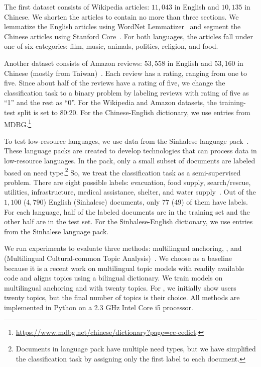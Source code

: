 The first dataset consists of Wikipedia articles: $11{,}043$ in English and $10{,}135$ in Chinese.  We shorten the articles to contain no more than three sections.  We lemmatize the English articles using WordNet Lemmatizer~\citep{bird-2009} and segment the Chinese articles using Stanford Core~\citep{manning-2014}.  For both languages, the articles fall under one of six categories: film, music, animals, politics, religion, and food.  

Another dataset consists of Amazon reviews: $53{,}558$ in English and $53{,}160$ in Chinese (mostly from Taiwan)~\citep{constant-2009}.  Each review has a rating, ranging from one to five.  Since about half of the reviews have a rating of five, we change the classification task to a binary problem by labeling reviews with rating of five as ``1'' and the rest as ``0''.  For the Wikipedia and Amazon datasets, the training-test split is set to 80:20.  For the Chinese-English dictionary, we use entries from MDBG.\footnote{\url{https://www.mdbg.net/chinese/dictionary?page=cc-cedict}.}

To test low-resource languages, we use data from the  Sinhalese language pack~\citep{strassel-2016}.  These language packs are created to develop technologies that can process data in low-resource languages.  In the pack, only a small subset of documents are labeled based on need type.\footnote{Documents in  language pack have multiple need types, but we have simplified the classification task by assigning only the first label to each document.}  So, we treat the classification task as a semi-supervised problem.  There are eight possible labels: evacuation, food supply, search/rescue, utilities, infrastructure, medical assistance, shelter, and water supply~\citep{strassel-2017}.  Out of the $1{,}100$ ($4{,}790$) English (Sinhalese) documents, only $77$ ($49$) of them have labels.  For each language, half of the labeled documents are in the training set and the other half are in the test set. For the Sinhalese-English dictionary, we use entries from the  Sinhalese language pack. 

We run experiments to evaluate three methods: multilingual anchoring, \mtanchor, and  (Multilingual Cultural-common Topic Analysis)~\citep{shi-2016}.  We choose  as a baseline because it is a recent work on multilingual topic models with readily available code and aligns topics using a bilingual dictionary.  We train models on multilingual anchoring and  with twenty topics.  For \mtanchor, we initially show users twenty topics, but the final number of topics is their choice.  All methods are implemented in Python on a 2.3 GHz Intel Core i5 processor.


